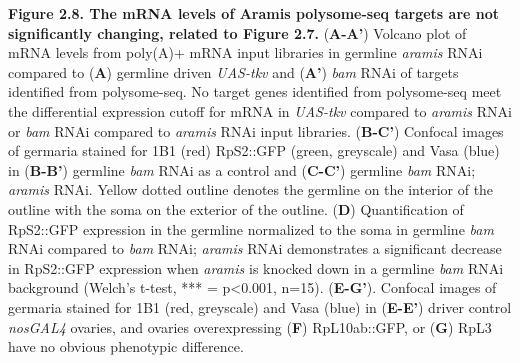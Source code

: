 \documentclass[12pt,oneside]{reedthesis}
\begin{document}
\textbf{\hfill\break
}

\textbf{Figure 2.8. The mRNA levels of Aramis polysome-seq targets
are not significantly changing, related to Figure 2.7.} (\textbf{A-A'})
Volcano plot of mRNA levels from poly(A)+ mRNA input libraries in
germline \emph{aramis} RNAi compared to (\textbf{A}) germline driven \emph{UAS-tkv}
and (\textbf{A'}) \emph{bam} RNAi of targets identified from polysome-seq. No
target genes identified from polysome-seq meet the differential
expression cutoff for mRNA in \emph{UAS-tkv} compared to \emph{aramis} RNAi or
\emph{bam} RNAi compared to \emph{aramis} RNAi input libraries. (\textbf{B-C'})
Confocal images of germaria stained for 1B1 (red) RpS2::GFP (green,
greyscale) and Vasa (blue) in (\textbf{B-B'}) germline \emph{bam} RNAi as a
control and (\textbf{C-C'}) germline \emph{bam} RNAi; \emph{aramis} RNAi. Yellow dotted
outline denotes the germline on the interior of the outline with the
soma on the exterior of the outline. (\textbf{D}) Quantification of RpS2::GFP
expression in the germline normalized to the soma in germline \emph{bam} RNAi
compared to \emph{bam} RNAi; \emph{aramis} RNAi demonstrates a significant
decrease in RpS2::GFP expression when \emph{aramis} is knocked down in a
germline \emph{bam} RNAi background (Welch's t-test, *** = p\textless0.001,
n=15). (\textbf{E-G'}). Confocal images of germaria stained for 1B1 (red,
greyscale) and Vasa (blue) in (\textbf{E-E'}) driver control \emph{nosGAL4}
ovaries, and ovaries overexpressing (\textbf{F}) RpL10ab::GFP, or (\textbf{G})
RpL3 have no obvious phenotypic difference.

\textbf{\hfill\break
}
\end{document}
